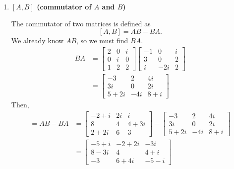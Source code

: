 \documentclass[11pt]{article}
\begin{document}
\begin{enumerate}[label=\textbf{\arabic*.}, start=4]
{\begin{enumerate}[label=\textbf{(\alph*)}]
{\begin{align*}
                            &=\begin{bmatrix}-2+i & 2i & i \\ 8 & 4 & 4+3i \\ 2+2i & 6 & 3\end{bmatrix}
                        \end{align*}
                    }
                    \item{
                        \textbf{\boldmath \([A,B]\) (commutator of \(A\) and \(B\))}
                        \par
                        The commutator of two matrices is defined as
                        \[[A,B]=AB-BA.\]
                        We already know \(AB\), so we must find \(BA\).
                        \begin{align*}
                            BA&=\begin{bmatrix}2 & 0 & i \\ 0 & i & 0 \\ 1 & 2 & 2\end{bmatrix}\begin{bmatrix}-1 & 0 & i \\ 3 & 0 & 2 \\ i & -2i & 2\end{bmatrix} \\
                            &=\begin{bmatrix}-3 & 2 & 4i \\ 3i & 0 & 2i \\ 5+2i & -4i & 8+i\end{bmatrix}
                        \end{align*}
                        Then,
                        \begin{align*}
                            [A,B]=AB-BA&=\begin{bmatrix}-2+i & 2i & i \\ 8 & 4 & 4+3i \\ 2+2i & 6 & 3\end{bmatrix}-\begin{bmatrix}-3 & 2 & 4i \\ 3i & 0 & 2i \\ 5+2i & -4i & 8+i\end{bmatrix} \\
                            &=\begin{bmatrix}-5+i & -2+2i & -3i \\ 8-3i & 4 & 4+i \\ -3 & 6+4i & -5-i\end{bmatrix}

\end{align*}}
\end{enumerate}}
\end{enumerate}
\end{document}
